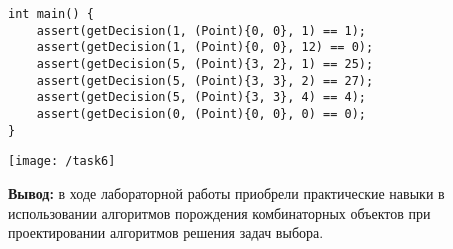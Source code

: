 \documentclass[a4paper,14pt]{extarticle}
\begin{document}
\begin{enumerate}[№1. ]
\begin{verbatim}
int main() {
	assert(getDecision(1, (Point){0, 0}, 1) == 1);
	assert(getDecision(1, (Point){0, 0}, 12) == 0);
	assert(getDecision(5, (Point){3, 2}, 1) == 25);
	assert(getDecision(5, (Point){3, 3}, 2) == 27);
	assert(getDecision(5, (Point){3, 3}, 4) == 4);
	assert(getDecision(0, (Point){0, 0}, 0) == 0);
}
	\end{verbatim}
\begin{center}
	\texttt{[image: /task6]}
\end{center}
\end{enumerate}
			\textbf{Вывод: } в ходе лабораторной работы приобрели практические навыки в использовании алгоритмов порождения комбинаторных объектов при проектировании алгоритмов решения задач выбора.
			
\end{document}
